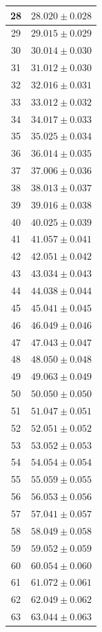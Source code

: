 \documentclass[prb,12pt]{revtex4-2}
\theoremstyle{definition}
\theoremstyle{definition}
\begin{document}
\begin{longtable}{cc}
28 & $28.020\pm 0.028$ \\\midrule
29 & $29.015\pm 0.029$ \\\midrule
30 & $30.014\pm 0.030$ \\\midrule
31 & $31.012\pm 0.030$ \\\midrule
32 & $32.016\pm 0.031$ \\\midrule
33 & $33.012\pm 0.032$ \\\midrule
34 & $34.017\pm 0.033$ \\\midrule
35 & $35.025\pm 0.034$ \\\midrule
36 & $36.014\pm 0.035$ \\\midrule
37 & $37.006\pm 0.036$ \\\midrule
38 & $38.013\pm 0.037$ \\\midrule
39 & $39.016\pm 0.038$ \\\midrule
40 & $40.025\pm 0.039$ \\\midrule
41 & $41.057\pm 0.041$ \\\midrule
42 & $42.051\pm 0.042$ \\\midrule
43 & $43.034\pm 0.043$ \\\midrule
44 & $44.038\pm 0.044$ \\\midrule
45 & $45.041\pm 0.045$ \\\midrule
46 & $46.049\pm 0.046$ \\\midrule
47 & $47.043\pm 0.047$ \\\midrule
48 & $48.050\pm 0.048$ \\\midrule
49 & $49.063\pm 0.049$ \\\midrule
50 & $50.050\pm 0.050$ \\\midrule
51 & $51.047\pm 0.051$ \\\midrule
52 & $52.051\pm 0.052$ \\\midrule
53 & $53.052\pm 0.053$ \\\midrule
54 & $54.054\pm 0.054$ \\\midrule
55 & $55.059\pm 0.055$ \\\midrule
56 & $56.053\pm 0.056$ \\\midrule
57 & $57.041\pm 0.057$ \\\midrule
58 & $58.049\pm 0.058$ \\\midrule
59 & $59.052\pm 0.059$ \\\midrule
60 & $60.054\pm 0.060$ \\\midrule
61 & $61.072\pm 0.061$ \\\midrule
62 & $62.049\pm 0.062$ \\\midrule
63 & $63.044\pm 0.063$ \\\midrule

\end{longtable}
\end{document}
